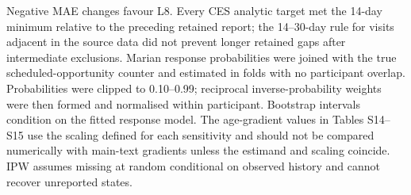 \documentclass[pdflatex,sn-vancouver-num]{sn-jnl}
\begin{document}
\begin{table}[!htbp]
\caption{Recall-period and Marian observation-process sensitivities.}\label{tab:s15}
\centering\small
{}
\begin{flushleft}\footnotesize Negative MAE changes favour L8. Every CES analytic target met the 14-day minimum relative to the preceding retained report; the 14--30-day rule for visits adjacent in the source data did not prevent longer retained gaps after intermediate exclusions. Marian response probabilities were joined with the true scheduled-opportunity counter and estimated in folds with no participant overlap. Probabilities were clipped to 0.10--0.99; reciprocal inverse-probability weights were then formed and normalised within participant. Bootstrap intervals condition on the fitted response model. The age-gradient values in Tables S14--S15 use the scaling defined for each sensitivity and should not be compared numerically with main-text gradients unless the estimand and scaling coincide. IPW assumes missing at random conditional on observed history and cannot recover unreported states.\end{flushleft}
\end{table}
\end{document}
